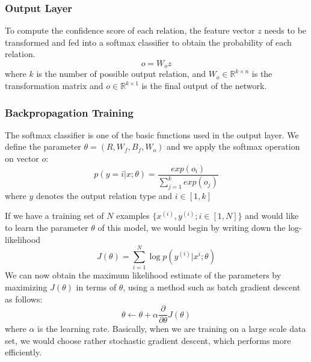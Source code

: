 \documentclass[12pt, a4paper, UTF8]{article}
\begin{document}
	\subsubsection{Output Layer}
	\noindent To compute the confidence score of each relation, the feature vector $z$ needs to be transformed and fed into a softmax classifier to obtain the probability of each relation.
	\begin{equation}
	o = W_o z
	\end{equation}
	where $k$ is the number of possible output relation, and $W_o \in \mathbb{R}^{k \times n}$ is the transformation matrix and $o \in \mathbb{R}^{k \times 1}$ is the final output of the network.
	
	\subsubsection{Backpropagation Training}
	\noindent The softmax classifier is one of the basic functions used in the output layer. We define the parameter $\theta = (R, W_f, B_f, W_o)$ and we apply the softmax operation on vector $o$:
	\begin{equation}
	p(y=i|x;\theta) = \frac{exp(o_i)}{\sum_{j=1}^{k}exp(o_j)}
	\end{equation}
	where $y$ denotes the output relation type and $i \in [1,k]$
	\par If we have a training set of $N$ examples $\{x^{(i)},y^{(i)};i \in \left[1,N\right]\}$ and would like to learn the parameter $\theta$ of this model, we would begin by writing down the log-likelihood
	\begin{equation}
	J(\theta) = \sum_{i=1}^{N}\log p(y^{(i)}|x^{i};\theta)
	\end{equation}
	We can now obtain the maximum likelihood estimate of the parameters by maximizing $J(\theta)$ in terms of $\theta$, using a method such as batch gradient descent as follows:
	\begin{equation}
	\theta \leftarrow \theta + \alpha\frac{\partial }{\partial\theta}J(\theta)
	\end{equation}
	where $\alpha$ is the learning rate. Basically, when we are training on a large scale data set, we would choose rather stochastic gradient descent, which performs more efficiently.
	
	
	
	
	
	
	
	
	
	
	
	
	
	
	
	
	
	
	
	
	
	
	
	
	
	
	
	
	
	
	
	
	
	
	
	
	
	
	
\end{document}
